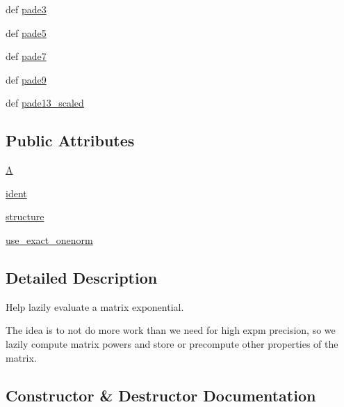 \begin{DoxyCompactItemize}
\item 
def \hyperlink{classscipy_1_1sparse_1_1linalg_1_1matfuncs_1_1__ExpmPadeHelper_a1486e339c13395092ac0ad31305d0b08}{pade3}
\item 
def \hyperlink{classscipy_1_1sparse_1_1linalg_1_1matfuncs_1_1__ExpmPadeHelper_aab2d26087e42a4833fdc3645a2fe9a05}{pade5}
\item 
def \hyperlink{classscipy_1_1sparse_1_1linalg_1_1matfuncs_1_1__ExpmPadeHelper_acc103e97ef240d799c359b18b7d32700}{pade7}
\item 
def \hyperlink{classscipy_1_1sparse_1_1linalg_1_1matfuncs_1_1__ExpmPadeHelper_a9b89d9d96c1a83ee5bcc6a812cee2701}{pade9}
\item 
def \hyperlink{classscipy_1_1sparse_1_1linalg_1_1matfuncs_1_1__ExpmPadeHelper_a400367d8ddbd9dc67fe36d1d59b1cd21}{pade13\+\_\+scaled}
\end{DoxyCompactItemize}
\subsection*{Public Attributes}
\begin{DoxyCompactItemize}
\item 
\hyperlink{classscipy_1_1sparse_1_1linalg_1_1matfuncs_1_1__ExpmPadeHelper_a3132d1186f41eea2881b700bea4808a9}{A}
\item 
\hyperlink{classscipy_1_1sparse_1_1linalg_1_1matfuncs_1_1__ExpmPadeHelper_a37601cee3d4999d1101e36fe4feae0f8}{ident}
\item 
\hyperlink{classscipy_1_1sparse_1_1linalg_1_1matfuncs_1_1__ExpmPadeHelper_a1408150ff0735dfe671d5572e0869aff}{structure}
\item 
\hyperlink{classscipy_1_1sparse_1_1linalg_1_1matfuncs_1_1__ExpmPadeHelper_ae9e32e33dcfc7d5afdc8a3c8645c1641}{use\+\_\+exact\+\_\+onenorm}
\end{DoxyCompactItemize}


\subsection{Detailed Description}
\begin{DoxyVerb}Help lazily evaluate a matrix exponential.

The idea is to not do more work than we need for high expm precision,
so we lazily compute matrix powers and store or precompute
other properties of the matrix.\end{DoxyVerb}
 

\subsection{Constructor \& Destructor Documentation}
\hypertarget{classscipy_1_1sparse_1_1linalg_1_1matfuncs_1_1__ExpmPadeHelper_ab402ab31fa3ca59bfffd2b8e261d3a5a}{}
